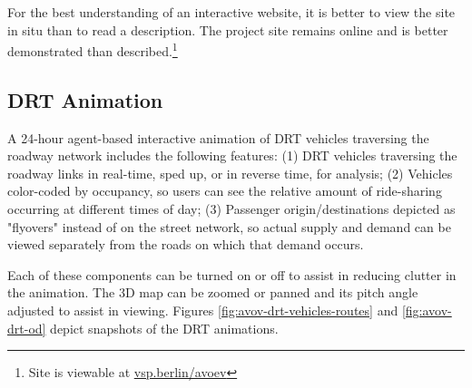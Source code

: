 For the best understanding of an interactive website, it is better to view the site in situ than to read a description. The project site remains online and is better demonstrated than described.\footnote{Site is viewable at \href{https://vsp.berlin/avoev/}{vsp.berlin/avoev}}

\subsection{DRT Animation}

A 24-hour agent-based interactive animation of DRT vehicles traversing the roadway network includes the following features: (1) DRT vehicles traversing the roadway links in real-time, sped up, or in reverse time, for analysis; (2) Vehicles color-coded by occupancy, so users can see the relative amount of ride-sharing occurring at different times of day; (3) Passenger origin/destinations depicted as "flyovers" instead of on the street network, so actual supply and demand can be viewed separately from the roads on which that demand occurs.

Each of these components can be turned on or off to assist in reducing clutter in the animation. The 3D map can be zoomed or panned and its pitch angle adjusted to assist in viewing. Figures \ref{fig:avov-drt-vehicles-routes} and \ref{fig:avov-drt-od} depict snapshots of the DRT animations.

